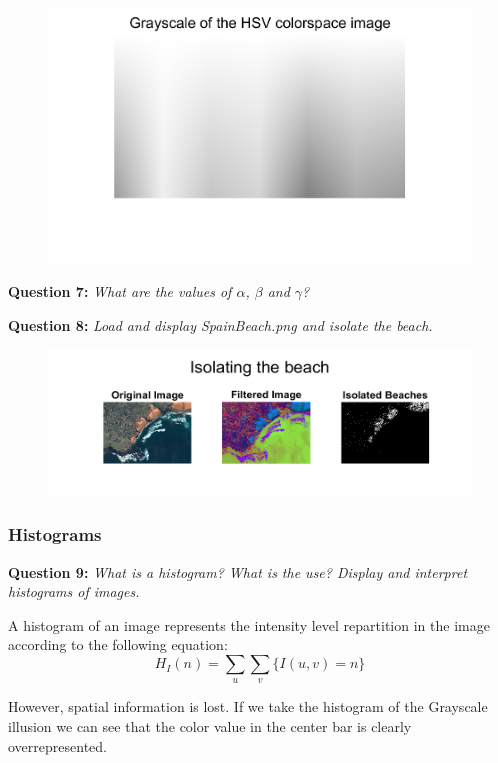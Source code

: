 \begin{figure}[H]
    \centering
    \includegraphics[width=0.5\linewidth]{Doc/Graphics/Part1_Question6b.png}
    \label{fig:enter-label}
\end{figure}



\textbf{Question 7:}
\textit{What are the values of $\alpha$, $\beta$ and $\gamma$?}

\TODO{}



\textbf{Question 8:}
\textit{Load and display SpainBeach.png and isolate the beach.}


\begin{figure}[H]
    \centering
    \includegraphics[width=\linewidth]{Doc/Graphics/Part1_Question8.png}
    \label{fig:enter-label}
\end{figure}



\subsubsection{Histograms}
\textbf{Question 9:}
\textit{What is a histogram? What is the use? Display and interpret histograms of images.}

A histogram of an image represents the intensity level repartition in the image according to the following equation:
\[H_I(n) = \sum_{u} \sum_{v} \{ I(u, v) = n \}\]

However, spatial information is lost. 
If we take the histogram of the Grayscale illusion we can see that the color value in the center bar is clearly overrepresented.


